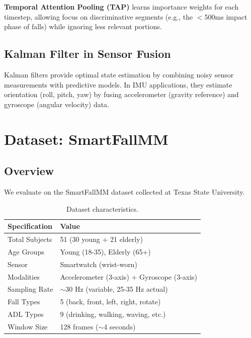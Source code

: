 \documentclass{article}
\begin{document}
\textbf{Temporal Attention Pooling (TAP)} learns importance weights for each timestep, allowing focus on discriminative segments (e.g., the $<$500ms impact phase of falls) while ignoring less relevant portions.

\subsection{Kalman Filter in Sensor Fusion}

Kalman filters provide optimal state estimation by combining noisy sensor measurements with predictive models. In IMU applications, they estimate orientation (roll, pitch, yaw) by fusing accelerometer (gravity reference) and gyroscope (angular velocity) data.

\section{Dataset: SmartFallMM}

\subsection{Overview}

We evaluate on the SmartFallMM dataset collected at Texas State University.

\begin{table}[htbp]
    \centering
    \caption{Dataset characteristics.}
    \label{tab:dataset}
    \begin{tabular}{ll}
        \toprule
        \textbf{Specification} & \textbf{Value} \\
        \midrule
        Total Subjects & 51 (30 young + 21 elderly) \\
        Age Groups & Young (18-35), Elderly (65+) \\
        Sensor & Smartwatch (wrist-worn) \\
        Modalities & Accelerometer (3-axis) + Gyroscope (3-axis) \\
        Sampling Rate & $\sim$30 Hz (variable, 25-35 Hz actual) \\
        Fall Types & 5 (back, front, left, right, rotate) \\
        ADL Types & 9 (drinking, walking, waving, etc.) \\
        Window Size & 128 frames ($\sim$4 seconds) \\
        \bottomrule
    \end{tabular}
\end{table}
\end{document}
